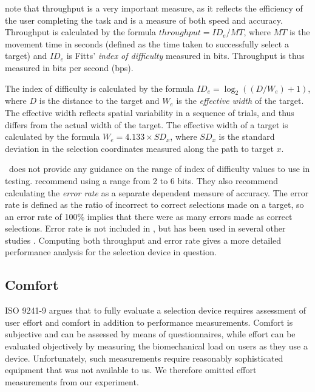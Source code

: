 \documentclass[reviewcopy]{elsart}
\begin{document}
\citet{Mack-IS-2001-EHCI} note that throughput is a very important
measure, as it reflects the efficiency of the user completing the task
and is a measure of both speed and accuracy. Throughput is calculated by
the formula \(\mathit{throughput} = \mathit{ID}_{e} / \mathit{MT}\),
where \(\mathit{MT}\) is the movement time in seconds (defined as the
time taken to successfully select a target) and \(\mathit{ID}_{e}\) is
Fitts' \citeyearpar{Fitt-PM-1954-Law} \emph{index of difficulty}
measured in bits. Throughput is thus measured in bits per second (bps).

The index of difficulty is calculated by the formula \(\mathit{ID}_{e} =
\log_{2}((D / W_{e}) + 1)\), where \(D\) is the distance to the target
and \(W_{e}\) is the \emph{effective width} of the target. The effective
width reflects spatial variability in a sequence of trials, and thus
differs from the actual width of the target. The effective width of a
target is calculated by the formula \(W_{e} = 4.133 \times
\mathit{SD}_{x}\), where \(\mathit{SD}_{x}\) is the standard deviation
in the selection coordinates measured along the path to target \(x\).

\ISOnine\ does not provide any guidance on the range of index of
difficulty values to use in testing. \citet{Doug-SA-1999-CHI} recommend
using a range from 2 to 6 bits. They also recommend calculating the
\emph{error rate} as a separate dependent measure of accuracy. The
error rate is defined as the ratio of incorrect to correct selections
made on a target, so an error rate of 100\% implies that there were as
many errors made as correct selections. Error rate is not included in
\ISOnine, but has been used in several other studies
\citep{Sear-A-1991-IJMMS,Sear-A-1993-BIT,Hara-H-1996,Bend-G-1999-PhD,
Doug-SA-1999-CHI,Mack-IS-2001-EHCI,Po-BA-2004-CHI}. Computing both
throughput and error rate gives a more detailed performance analysis for
the selection device in question.


\subsection{Comfort}
\label{sec-evaluation-comfort}

ISO 9241-9 argues that to fully evaluate a selection device requires
assessment of user effort and comfort in addition to performance
measurements. Comfort is subjective and can be assessed by means of
questionnaires, while effort can be evaluated objectively by measuring
the biomechanical load on users as they use a device. Unfortunately,
such measurements require reasonably sophisticated equipment
\citep{Doug-SA-1999-CHI} that was not available to us. We therefore
omitted effort measurements from our experiment.
\end{document}
